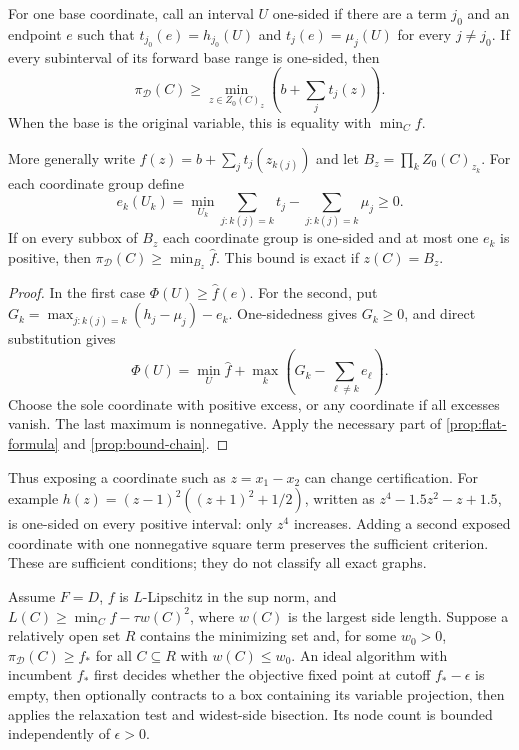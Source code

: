 \begin{corollary}
\label{prop:one-sided}
For one base coordinate, call an interval $U$ one-sided if there are a term
$j_0$ and an endpoint $e$ such that
$t_{j_0}(e)=h_{j_0}(U)$ and $t_j(e)=\mu_j(U)$ for every $j\ne j_0$.
If every subinterval of its forward base range is one-sided, then
\[
 \pi_{\mathcal D}(C)\ge\min_{z\in Z_0(C)_z}
 \left(b+\sum_jt_j(z)\right).
\]
When the base is the original variable, this is equality with $\min_Cf$.

More generally write $\widehat f(z)=b+\sum_jt_j(z_{k(j)})$ and let
$B_z=\prod_kZ_0(C)_{z_k}$. For each coordinate group define
\[
 e_k(U_k)=\min_{U_k}\sum_{j:k(j)=k}t_j-
                   \sum_{j:k(j)=k}\mu_j\ge0.
\]
If on every subbox of $B_z$ each coordinate group is one-sided and at
most one $e_k$ is positive, then
$\pi_{\mathcal D}(C)\ge\min_{B_z}\widehat f$.
This bound is exact if $z(C)=B_z$.
\end{corollary}

\begin{proof}
In the first case $\Phi(U)\ge\widehat f(e)$.
For the second, put
$G_k=\max_{j:k(j)=k}(h_j-\mu_j)-e_k$. One-sidedness gives $G_k\ge0$, and
direct substitution gives
\[
 \Phi(U)=\min_U\widehat f+
 \max_k\left(G_k-\sum_{\ell\ne k}e_\ell\right).
\]
Choose the sole coordinate with positive excess, or any coordinate if
all excesses vanish. The last maximum is nonnegative. Apply the necessary
part of \cref{prop:flat-formula} and \eqref{prop:bound-chain}.
\end{proof}

Thus exposing a coordinate such as $z=x_1-x_2$ can change certification.
For example $h(z)=(z-1)^2((z+1)^2+1/2)$, written as
$z^4-1.5z^2-z+1.5$, is one-sided on every positive interval: only $z^4$
increases. Adding a second exposed coordinate with one nonnegative square
term preserves the sufficient criterion. These are sufficient conditions;
they do not classify all exact graphs.

\begin{theorem}
\label{prop:local-exactness}
Assume $F=D$, $f$ is $L$-Lipschitz in the sup norm, and
$L(C)\ge\min_Cf-\tau w(C)^2$, where $w(C)$ is the largest side length.
Suppose a relatively open set $R$ contains the minimizing set and, for
some $w_0>0$,
$\pi_{\mathcal D}(C)\ge f_*$ for all $C\subseteq R$ with $w(C)\le w_0$.
An ideal algorithm with incumbent $f_*$ first decides whether the objective
fixed point at cutoff $f_* -\epsilon$ is empty, then optionally contracts
to a box containing its variable projection, then applies the relaxation
test and widest-side bisection. Its node count is bounded independently of
$\epsilon>0$.
\end{theorem}

